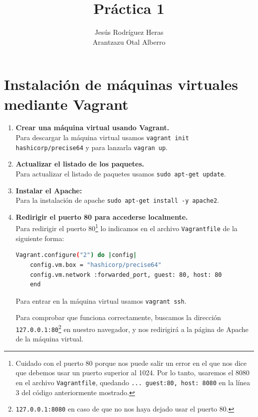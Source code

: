 \documentclass[12pt,letterpaper]{article}
\title{Práctica 1}
\author{Jesús Rodríguez Heras\\
	Arantzazu Otal Alberro}
\begin{document}
	
	\maketitle
%			
	\thispagestyle{empty}
	\newpage
	
	
	
	
	
	\lstset{language=bash, numbers=left, numberstyle=\tiny, numbersep=10pt, firstnumber=1, stepnumber=1, basicstyle=\small\ttfamily, tabsize=1, extendedchars=true, inputencoding=latin1}
	
\section{Instalación de máquinas virtuales mediante Vagrant}
\begin{enumerate}
	\item \textbf{Crear una máquina virtual usando Vagrant.} \\
	Para descargar la máquina virtual usamos \texttt{vagrant init hashicorp/precise64} y para lanzarla \texttt{vagran up}.
	\item \textbf{Actualizar el listado de los paquetes.} \\
	Para actualizar el listado de paquetes usamos \texttt{sudo apt-get update}.
	\item \textbf{Instalar el Apache:} \\
	Para la instalación de apache \texttt{sudo apt-get install -y apache2}.
	\item \textbf{Redirigir el puerto 80 para accederse localmente.} \\
	Para redirigir el puerto 80\footnote{Cuidado con el puerto 80 porque nos puede salir un error en el que nos dice que debemos usar un puerto superior al 1024. Por lo tanto, usaremos el 8080 en el archivo \texttt{Vagrantfile}, quedando \texttt{... guest:80, host: 8080} en la línea 3 del código anteriormente mostrado.} lo indicamos en el archivo \texttt{Vagrantfile} de la siguiente forma:
	\begin{lstlisting}[language=Bash]
	Vagrant.configure("2") do |config|
	config.vm.box = "hashicorp/precise64"
	config.vm.network :forwarded_port, guest: 80, host: 80
	end
	\end{lstlisting}
	
	Para entrar en la máquina virtual usamos \texttt{vagrant ssh}.
	
	Para comprobar que funciona correctamente, buscamos la dirección \texttt{127.0.0.1:80}\footnote{\texttt{127.0.0.1:8080} en caso de que no nos haya dejado usar el puerto 80.} en nuestro navegador, y nos redirigirá a la página de Apache de la máquina virtual.
		
\end{enumerate}
\end{document}
